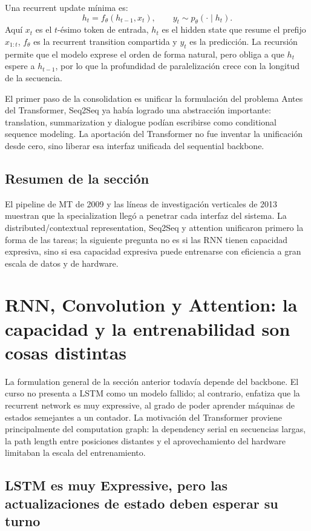 \documentclass[a4paper]{article}
\begin{document}
Una recurrent update mínima es:
\[
h_t=f_\theta(h_{t-1},x_t),\qquad y_t\sim p_\theta(\cdot\mid h_t).
\]
Aquí $x_t$ es el $t$-ésimo token de entrada, $h_t$ es el hidden state que resume el prefijo $x_{1:t}$, $f_\theta$ es la recurrent transition compartida y $y_t$ es la predicción. La recursión permite que el modelo exprese el orden de forma natural, pero obliga a que $h_t$ espere a $h_{t-1}$, por lo que la profundidad de paralelización crece con la longitud de la secuencia.

\begin{importantbox}{El primer paso de la consolidation es unificar la formulación del problema}
Antes del Transformer, Seq2Seq ya había logrado una abstracción importante: translation, summarization y dialogue podían escribirse como conditional sequence modeling. La aportación del Transformer no fue inventar la unificación desde cero, sino liberar esa interfaz unificada del sequential backbone.
\end{importantbox}

\subsection{Resumen de la sección}

El pipeline de MT de 2009 y las líneas de investigación verticales de 2013 muestran que la specialization llegó a penetrar cada interfaz del sistema. La distributed/contextual representation, Seq2Seq y attention unificaron primero la forma de las tareas; la siguiente pregunta no es si las RNN tienen capacidad expresiva, sino si esa capacidad expresiva puede entrenarse con eficiencia a gran escala de datos y de hardware.
\section{RNN, Convolution y Attention: la capacidad y la entrenabilidad son cosas distintas}

La formulation general de la sección anterior todavía depende del backbone. El curso no presenta a LSTM como un modelo fallido; al contrario, enfatiza que la recurrent network es muy expressive, al grado de poder aprender máquinas de estados semejantes a un contador. La motivación del Transformer proviene principalmente del computation graph: la dependency serial en secuencias largas, la path length entre posiciones distantes y el aprovechamiento del hardware limitaban la escala del entrenamiento.

\subsection{LSTM es muy Expressive, pero las actualizaciones de estado deben esperar su turno}
\end{document}
